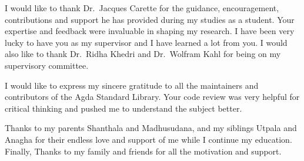 
I would like to thank Dr.\  Jacques Carette for the guidance, encouragement,
contributions and support he has provided during my studies as a student. Your
expertise and feedback were invaluable in shaping my research. I have been very
lucky to have you as my supervisor and I have learned a lot from you. I would
also like to thank Dr.\  Ridha Khedri and Dr.\ Wolfram Kahl for being on my
supervisory committee.

I would like to express my sincere gratitude to all the maintainers and
contributors of the Agda Standard Library. Your code review was very helpful for
critical thinking and pushed me to understand the subject better. 

Thanks to my parents Shanthala and Madhusudana, and my siblings Utpala and Anagha
for their endless love and support of me while I continue my education. Finally,
Thanks to my family and friends for all the motivation and support.